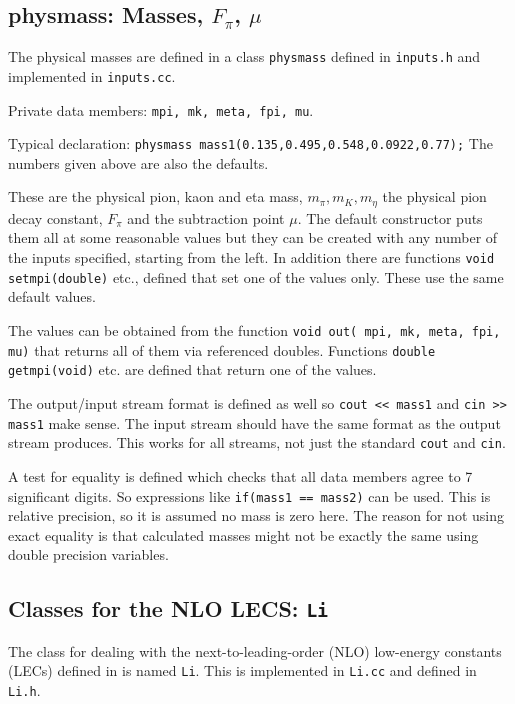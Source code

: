\documentclass[12pt,a4paper]{article}
\begin{document}
\subsection{physmass: Masses, $F_\pi$, $\mu$}

The physical masses are defined in a class \texttt{physmass} defined in
 \texttt{inputs.h} and implemented in \texttt{inputs.cc}. 

Private data members: \texttt{mpi, mk, meta, fpi, mu}.

Typical declaration: \texttt{physmass mass1(0.135,0.495,0.548,0.0922,0.77);}
The numbers given above are also the defaults. 

These are the physical pion, kaon and eta mass, $m_\pi,m_K,m_\eta$
the physical pion decay constant, $F_\pi$ and the subtraction point $\mu$.
The default constructor puts them all at some reasonable 
values but they can be created with any
number of the inputs specified, starting from the left.
In addition there are functions \texttt{void setmpi(double)} etc., defined
that set one of the values only. These use the same default values.

The values can be obtained from the function
\texttt{void out( mpi, mk, meta, fpi, mu)} that returns all of them via
referenced doubles. Functions \texttt{double getmpi(void)} etc. are defined
that return one of the values.

The output/input stream format is defined as well so \texttt{cout << mass1}
and \texttt{cin >> mass1} make sense. 
The input stream should have the same format as the output stream produces.
This works for all streams, not just the standard \texttt{cout} and
\texttt{cin}.

A test for equality is defined which checks that all data members agree to 7 
significant digits. So expressions like \texttt{if(mass1 == mass2)} can be used.
This is relative precision, so it is assumed no mass is zero here.
The reason for not using exact equality is that calculated masses might not be
exactly the same using double precision variables. 

\subsection{Classes for the NLO LECS: \texttt{Li}}

The class for dealing with the next-to-leading-order (NLO)
low-energy constants (LECs) defined in \cite{Gasser:1984gg} is
named \texttt{Li}.
This is implemented in \texttt{Li.cc} and defined in \texttt{Li.h}.
\end{document}

